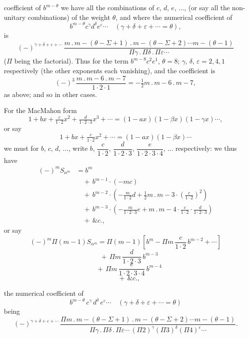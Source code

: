 \documentclass[11pt,a4paper]{article}
\begin{document}
coefficient of $b^{m-\theta}$ we have all the combinations of $c$, $d$, $e$, $\ldots$, (or say all the non-unitary combinations) of the weight $\theta$, and where the numerical coefficient of
\[
b^{m-\theta} c^{\gamma} d^{\delta} e^{\varepsilon}\cdots \quad(\gamma + \delta + \varepsilon + \cdots = \theta),
\]
is
\[
(-)^{\gamma + \delta + \varepsilon + \cdots}\,\frac{m\,.\,m-(\theta-\Sigma+1)\,.\,m-(\theta-\Sigma+2)\cdots m-(\theta-1)}{\Pi\gamma\,.\,\Pi\delta\,.\,\Pi\varepsilon\cdots}
\]
($\Pi$ being the factorial). Thus for the term $b^{m-8}c^2 e^1$, $\theta = 8$; $\gamma$, $\delta$, $\varepsilon = 2, 4, 1$ respectively (the other exponents each vanishing), and the coefficient is
\[
(-)^3\,\frac{m\,.\,m-6\,.\,m-7}{1\cdot 2\cdot 1} = -\tfrac{1}{2}m\,.\,m-6\,.\,m-7,
\]
as above; and so in other cases.

For the MacMahon form
\[
1 + bx + \tfrac{c}{1\cdot 2}x^2 + \tfrac{d}{1\cdot 2\cdot 3}x^3 + \cdots = (1 - ax)(1 - \beta x)(1 - \gamma x)\cdots,
\]
or say
\[
1 + bx + \tfrac{c}{1\cdot 2}x^2 + \cdots = (1 - ax)(1 - \beta x)\cdots
\]
we must for $b$, $c$, $d$, $\ldots$, write $b$, $\dfrac{c}{1\cdot 2}$, $\dfrac{d}{1\cdot 2\cdot 3}$, $\dfrac{e}{1\cdot 2\cdot 3\cdot 4}$, $\ldots$ respectively: we thus have
\begin{align*}
(-)^m S_{\alpha^m} &= b^m \\
&\quad +\,b^{m-1}\cdot(-mc) \\
&\quad +\,b^{m-2}\cdot\!\left(-\tfrac{m}{1\cdot 2}d + \tfrac{1}{2}m\,.\,m-3\cdot\!\left(\tfrac{c}{1\cdot 2}\right)^{\!2}\right) \\
&\quad +\,b^{m-3}\cdot\!\left(-\tfrac{m}{1\cdot 2\cdot 3}e + m\,.\,m-4\cdot\tfrac{c}{1\cdot 2}\cdot\tfrac{d}{1\cdot 2\cdot 3}\right) \\
&\quad +\,\&c.,
\end{align*}
or say
\[
(-)^m \Pi(m-1) S_{\alpha^m} = \Pi(m - 1)\!\left[b^m - \Pi m\,\frac{c}{1\cdot 2}\,b^{m-2} + \cdots\right]
\]
\[
\quad +\,\Pi m\,\frac{d}{1\cdot 2\cdot 3}\,b^{m-3}
\]
\[
\quad +\,\Pi m\,\frac{e}{1\cdot 2\cdot 3\cdot 4}\,b^{m-4}
\]
\[
\quad +\,\&c.,
\]

the numerical coefficient of
\[
b^{m-\theta}\,c^{\gamma}\,d^{\delta}\,e^{\varepsilon}\cdots\quad (\gamma + \delta + \varepsilon + \cdots = \theta)
\]
being
\[
(-)^{\gamma + \delta + \varepsilon + \cdots}\,\frac{\Pi m\,.\,m-(\theta-\Sigma+1)\,.\,m-(\theta-\Sigma+2)\cdots m-(\theta-1)}{\Pi\gamma\,.\,\Pi\delta\,.\,\Pi\varepsilon\cdots\,(\Pi 2)^{\gamma}(\Pi 3)^{\delta}(\Pi 4)^{\varepsilon}\cdots}.
\]
\end{document}

